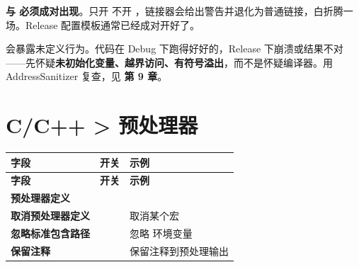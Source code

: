 \begin{warnbox}[注意]
\textbf{ 与  必须成对出现}。只开  不开 ，链接器会给出警告并退化为普通链接，白折腾一场。Release 配置模板通常已经成对开好了。
\end{warnbox}

\begin{keybox}[实战场景]
 会暴露未定义行为。代码在 Debug 下跑得好好的，Release 下崩溃或结果不对——先怀疑\textbf{未初始化变量、越界访问、有符号溢出}，而不是怀疑编译器。用 AddressSanitizer 复查，见 \textbf{第 9 章}。
\end{keybox}

\section{C/C++ > 预处理器}

\begin{longtable}{L{3.8cm}L{2.0cm}L{8.6cm}}
\toprule
\textbf{字段} & \textbf{开关} & \textbf{示例} \\
\midrule
\endfirsthead
\toprule
\textbf{字段} & \textbf{开关} & \textbf{示例} \\
\midrule
\endhead
\bottomrule
\endlastfoot
\textbf{预处理器定义} &  &  \\
\textbf{取消预处理器定义} &  & 取消某个宏 \\
\textbf{忽略标准包含路径} &  & 忽略  环境变量 \\
\textbf{保留注释} &  & 保留注释到预处理输出 \\
\end{longtable}

